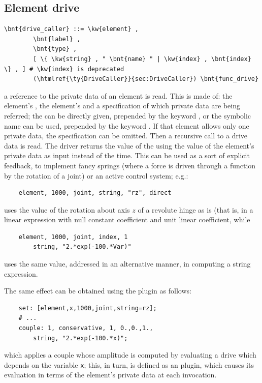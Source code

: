 \subsection{Element drive}\label{sec:DriveCaller:ELEMENT}
\begin{Verbatim}[commandchars=\\\{\}]
    \bnt{drive_caller} ::= \kw{element} ,
        \bnt{label} ,
        \bnt{type} ,
        [ \{ \kw{string} , " \bnt{name} " | \kw{index} , \bnt{index} \} , ] # \kw{index} is deprecated
        (\htmlref{\ty{DriveCaller}}{sec:DriveCaller}) \bnt{func_drive}
\end{Verbatim}
a reference to the private data of an element is read.
This is made of: the element's , the element's 
and a specification of which private data are being referred;
the  can be directly given, prepended by the keyword
, or the symbolic name  can be used, prepended by 
the keyword .
If that element allows only one private data, the specification 
can be omitted.
Then a recursive call to a drive data is read. 
The driver returns the value of the  
 using the value of the 
element's private data as input instead of the time. 
This can be used as a sort of explicit feedback, to implement fancy
springs (where a force is driven through a function by the rotation
of a joint) or an active control system; e.g.:
\begin{verbatim}
    element, 1000, joint, string, "rz", direct
\end{verbatim}
uses the value of the rotation about axis $z$ of a revolute hinge
as is (that is, in a linear expression with null constant coefficient 
and unit linear coefficient, while
\begin{verbatim}
    element, 1000, joint, index, 1
        string, "2.*exp(-100.*Var)"
\end{verbatim}
uses the same value, addressed in an alternative manner, in computing
a string expression.

The same effect can be obtained using the  plugin as follows:
\begin{verbatim}
    set: [element,x,1000,joint,string=rz];
    # ...
    couple: 1, conservative, 1, 0.,0.,1.,
        string, "2.*exp(-100.*x)";
\end{verbatim}
which applies a couple whose amplitude is computed by evaluating
a  drive which depends on the variable \texttt{x}; this, in turn,
is defined as an  plugin, which causes its evaluation
in terms of the element's private data at each invocation.

